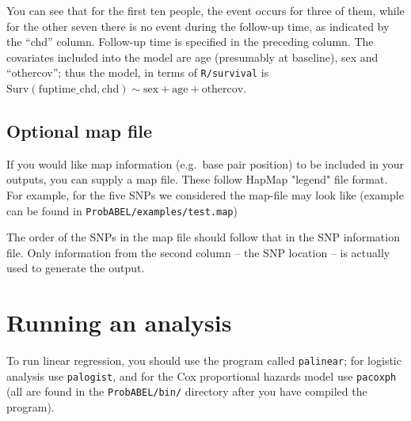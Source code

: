 \documentclass[12pt,a4paper]{article}
\begin{document}


You can see that for the first ten people, the event occurs for three of
them, while for the other seven there is no event during the follow-up
time, as indicated by the ``chd'' column. Follow-up time is specified in the preceding
column. The covariates included into the model are age (presumably
at baseline), sex and ``othercov''; thus the model, in terms of
\texttt{R/survival} is \\ $\textrm{Surv}(\textrm{fuptime\_chd},
\textrm{chd}) \sim \textrm{sex} + \textrm{age} + \textrm{othercov}$.

\subsection{Optional map file}
If you would like map information (e.g.~base pair position) to
be included in your outputs, you can supply a map file. These follow
HapMap "legend" file format. For example, for the five SNPs we considered
the map-file may look like (example can be found in
\texttt{ProbABEL/examples/test.map})



The order of the SNPs in the map file should follow that in the SNP information
file. Only information from the second column -- the SNP location -- is
actually used to generate the output.

\section{Running an analysis}
\label{sec:runanalysis}
To run linear regression, you should use the program called
\texttt{palinear}; for logistic analysis use \texttt{palogist}, and
for the Cox proportional hazards model use \texttt{pacoxph} (all are
found in the \texttt{ProbABEL/bin/} directory after you have compiled
the program).
\end{document}
